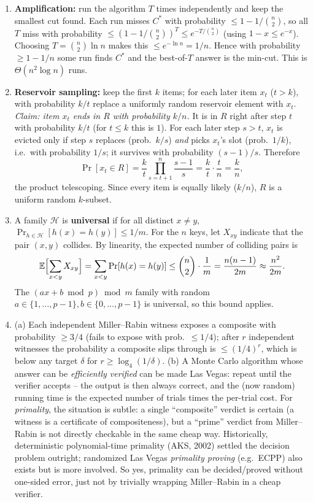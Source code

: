 \documentclass[11pt]{article}
\begin{document}
\begin{enumerate}[label=\textbf{A\arabic*.}, leftmargin=2.2em]
\item \textbf{Amplification:} run the algorithm $T$ times independently and keep the
smallest cut found. Each run misses $C^*$ with probability $\le 1 - 1/\binom{n}{2}$, so all
$T$ miss with probability $\le (1 - 1/\binom n2)^T \le e^{-T/\binom n2}$ (using $1-x \le
e^{-x}$). Choosing $T = \binom{n}{2}\ln n$ makes this $\le e^{-\ln n} = 1/n$. Hence with
probability $\ge 1 - 1/n$ some run finds $C^*$ and the best-of-$T$ answer is the min-cut.
This is $\Theta(n^2 \log n)$ runs.

\item \textbf{Reservoir sampling:} keep the first $k$ items; for each later item $x_t$
($t>k$), with probability $k/t$ replace a uniformly random reservoir element with $x_t$.
\emph{Claim: item $x_t$ ends in $R$ with probability $k/n$.} It is in $R$ right after step
$t$ with probability $k/t$ (for $t\le k$ this is $1$). For each later step $s>t$, $x_t$ is
evicted only if step $s$ replaces (prob.\ $k/s$) \emph{and} picks $x_t$'s slot (prob.\
$1/k$), i.e.\ with probability $1/s$; it survives with probability $(s-1)/s$. Therefore
\[
\Pr[x_t\in R] = \frac{k}{t}\prod_{s=t+1}^{n}\frac{s-1}{s} = \frac{k}{t}\cdot\frac{t}{n} = \frac{k}{n},
\]
the product telescoping. Since every item is equally likely ($k/n$), $R$ is a uniform
random $k$-subset.

\item A family $\mathcal H$ is \textbf{universal} if for all distinct $x \ne y$,
$\Pr_{h\in\mathcal H}[h(x)=h(y)] \le 1/m$. For the $n$ keys, let $X_{xy}$ indicate that the
pair $(x,y)$ collides. By linearity, the expected number of colliding pairs is
\[
\mathbb{E}\Bigl[\sum_{x<y} X_{xy}\Bigr] = \sum_{x<y}\Pr[h(x)=h(y)] \le \binom{n}{2}\cdot\frac1m = \frac{n(n-1)}{2m} \approx \frac{n^2}{2m}.
\]
The $(ax+b\bmod p)\bmod m$ family with random $a\in\{1,\ldots,p-1\}, b\in\{0,\ldots,p-1\}$
is universal, so this bound applies.

\item (a) Each independent Miller--Rabin witness exposes a composite with probability
$\ge 3/4$ (fails to expose with prob.\ $\le 1/4$); after $r$ independent witnesses the
probability a composite slips through is $\le (1/4)^r$, which is below any target $\delta$
for $r \ge \log_4(1/\delta)$. (b) A Monte Carlo algorithm whose answer can be
\emph{efficiently verified} can be made Las Vegas: repeat until the verifier accepts -- the
output is then always correct, and the (now random) running time is the expected number of
trials times the per-trial cost. For \emph{primality}, the situation is subtle: a single
``composite'' verdict is certain (a witness is a certificate of compositeness), but a
``prime'' verdict from Miller--Rabin is not directly checkable in the same cheap way.
Historically, deterministic polynomial-time primality (AKS, 2002) settled the decision
problem outright; randomized Las Vegas \emph{primality proving} (e.g.\ ECPP) also exists but
is more involved. So yes, primality can be decided/proved without one-sided error, just not
by trivially wrapping Miller--Rabin in a cheap verifier.

\end{enumerate}
\end{document}
